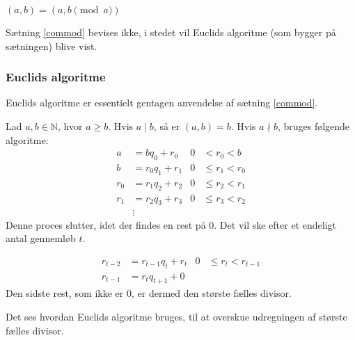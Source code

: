 \begin{sent}
    \label{commod}
    \((a, b) = (a, b \pmod{a})\)
\end{sent}

Sætning \ref{commod} bevises ikke, i stedet vil Euclids algoritme (som bygger på sætningen) blive vist.

\subsubsection{Euclids algoritme}
Euclids algoritme er essentielt gentagen anvendelse af sætning \ref{commod}.
\begin{definition}
    Lad \(a, b \in \mathbb{N}\), hvor \(a \geq b\).
    Hvis \(a \mid b\), så er \((a, b) = b\).
    Hvis \(a \nmid b\), bruges følgende algoritme:
    \begin{align*}
        a   &= b q_0    + r_0   & 0 &<    r_0 < b\\
        b   &= r_0 q_1  + r_1   & 0 &\leq r_1 < r_0\\
        r_0 &= r_1 q_2  + r_2   & 0 &\leq r_2 < r_1\\
        r_1 &= r_2 q_3  + r_3   & 0 &\leq r_3 < r_2\\
        &\vdots
    \end{align*}
    Denne proces slutter, idet der findes en rest på 0.
    Det vil ske efter et endeligt antal gennemløb \(t\).

    \begin{align*}
        r_{t-2} &= r_{t-1}  q_t      + r_t   & 0 &\leq r_t < r_{t-1}\\
        r_{t-1} &= r_t      q_{t+1}  + 0
    \end{align*}
    Den sidste rest, som ikke er 0, er dermed den største fælles divisor.\cite[11]{absalg}
\end{definition}

Det ses hvordan Euclids algoritme bruges, til at overskue udregningen af største fælles divisor.

